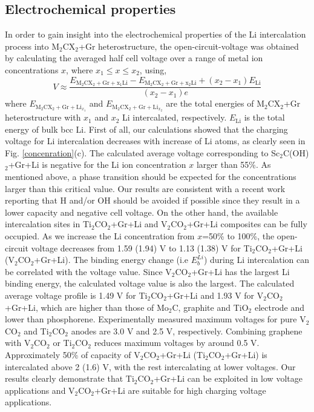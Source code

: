 \subsection{Electrochemical properties}

In order to gain insight into the electrochemical properties of the Li intercalation process into M$_2$CX$_2$+Gr heterostructure, the open-circuit-voltage was obtained by calculating the averaged half cell voltage over a range of metal ion concentrations $x$, where $x_1\leq x\leq x_2$, using,
\begin{equation}
V\approx\frac{E_{\mathrm{M}_2\mathrm{C}\mathrm{X}_2+\mathrm{Gr}+\mathrm{x_1Li}}-E_{\mathrm{M}_2\mathrm{C}\mathrm{X}_2+\mathrm{Gr}+\mathrm{x_2Li}}+(x_2-x_1)E_{\mathrm{Li}}}{(x_2-x_1)e}
\end{equation}
where $E_{\mathrm{M}_2\mathrm{C}\mathrm{X}_2+\mathrm{Gr}+\mathrm{Li}_{x_1}}$ and $E_{\mathrm{M}_2\mathrm{C}\mathrm{X}_2+\mathrm{Gr}+\mathrm{Li}_{x_2}}$ are the total energies of M$_2$CX$_2$+Gr heterostructure with $x_1$ and $x_2$ Li intercalated, respectively.  $E_{\mathrm{Li}}$ is the total energy of bulk bcc Li.  First of all, our calculations showed that the charging voltage for Li intercalation decreases with increase of Li atoms, as clearly seen in Fig. \ref{concenration}(c). The calculated average voltage corresponding to Sc$_2$C(OH)$_2$+Gr+Li is negative for the Li ion concentration $x$ larger than 55\%. As mentioned above, a phase transition should be expected for the concentrations larger than this critical value. Our results are consistent with a recent work reporting that H and/or OH should be avoided if possible since they result in a lower capacity and negative cell voltage\cite{Xie2014,Tang2012}. On the other hand, the available intercalation sites in Ti$_2$CO$_2$+Gr+Li and V$_2$CO$_2$+Gr+Li composites can be fully occupied.
As we increase the Li concentration from $x$=50\% to 100\%, the open-circuit voltage decreases from 1.59 (1.94) V to 1.13 (1.38) V for Ti$_2$CO$_2$+Gr+Li (V$_2$CO$_2$+Gr+Li). The binding energy change (i.e $E_{b}^{Li}$) during Li intercalation can be correlated with the voltage value. Since V$_2$CO$_2$+Gr+Li has the largest Li binding energy, the calculated voltage value is also the largest. The calculated average voltage profile is 1.49 V for Ti$_2$CO$_2$+Gr+Li and 1.93 V for V$_2$CO$_2$+Gr+Li, which are higher than those of Mo$_2$C\cite{C6TA01918H}, graphite\cite{ceder4} and TiO$_2$ electrode \cite{tio2-voltage} and lower than phosphorene\cite{doi:10.1021/nl504336h}. Experimentally measured maximum voltages for pure V$_2$CO$_2$ and Ti$_2$CO$_2$ anodes are 3.0 V and 2.5 V, respectively\cite{doi:10.1021/ja405735d,gdgdgd}. Combining graphene with V$_2$CO$_2$ or Ti$_2$CO$_2$ reduces maximum voltages by around 0.5 V.  Approximately 50\% of capacity of V$_2$CO$_2$+Gr+Li (Ti$_2$CO$_2$+Gr+Li) is intercalated above 2 (1.6) V, with the rest intercalating at lower voltages. Our results clearly demonstrate that Ti$_2$CO$_2$+Gr+Li can be exploited in low voltage applications and V$_2$CO$_2$+Gr+Li are suitable for high charging voltage applications.

